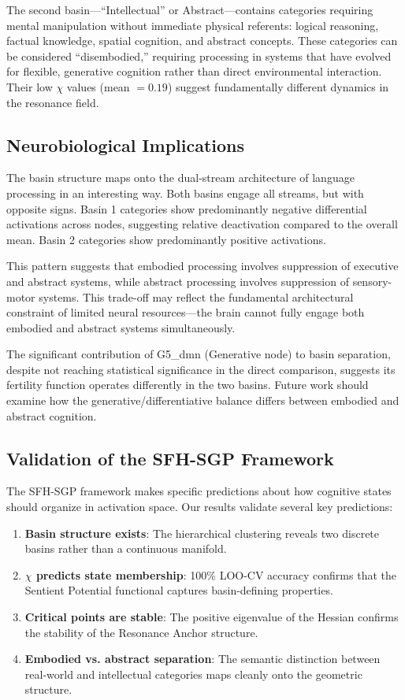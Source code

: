 \documentclass[12pt]{article}
\numberwithin{equation}{section}
\begin{document}
The second basin---``Intellectual'' or Abstract---contains categories requiring mental manipulation without immediate physical referents: logical reasoning, factual knowledge, spatial cognition, and abstract concepts. These categories can be considered ``disembodied,'' requiring processing in systems that have evolved for flexible, generative cognition rather than direct environmental interaction. Their low $\chi$ values (mean $=0.19$) suggest fundamentally different dynamics in the resonance field.

\subsection{Neurobiological Implications}

The basin structure maps onto the dual-stream architecture of language processing \citep{Hickok2007} in an interesting way. Both basins engage all streams, but with opposite signs. Basin 1 categories show predominantly negative differential activations across nodes, suggesting relative deactivation compared to the overall mean. Basin 2 categories show predominantly positive activations.

This pattern suggests that embodied processing involves suppression of executive and abstract systems, while abstract processing involves suppression of sensory-motor systems. This trade-off may reflect the fundamental architectural constraint of limited neural resources---the brain cannot fully engage both embodied and abstract systems simultaneously.

The significant contribution of G5\_dmn (Generative node) to basin separation, despite not reaching statistical significance in the direct comparison, suggests its fertility function operates differently in the two basins. Future work should examine how the generative/differentiative balance differs between embodied and abstract cognition.

\subsection{Validation of the SFH-SGP Framework}

The SFH-SGP framework makes specific predictions about how cognitive states should organize in activation space. Our results validate several key predictions:

\begin{enumerate}
	\item \textbf{Basin structure exists}: The hierarchical clustering reveals two discrete basins rather than a continuous manifold.
	\item \textbf{$\chi$ predicts state membership}: 100\% LOO-CV accuracy confirms that the Sentient Potential functional captures basin-defining properties.
	\item \textbf{Critical points are stable}: The positive eigenvalue of the Hessian confirms the stability of the Resonance Anchor structure.
	\item \textbf{Embodied vs. abstract separation}: The semantic distinction between real-world and intellectual categories maps cleanly onto the geometric structure.
\end{enumerate}
\end{document}
